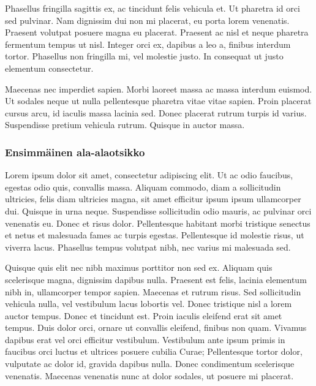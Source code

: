 \documentclass[12pt,a4paper,titlepage]{article}
\begin{document}
Phasellus fringilla sagittis ex, ac tincidunt felis vehicula et. Ut pharetra id orci sed pulvinar. Nam dignissim dui non mi placerat, eu porta lorem venenatis. Praesent volutpat posuere magna eu placerat. Praesent ac nisl et neque pharetra fermentum tempus ut nisl. Integer orci ex, dapibus a leo a, finibus interdum tortor. Phasellus non fringilla mi, vel molestie justo. In consequat ut justo elementum consectetur.

Maecenas nec imperdiet sapien. Morbi laoreet massa ac massa interdum euismod. Ut sodales neque ut nulla pellentesque pharetra vitae vitae sapien. Proin placerat cursus arcu, id iaculis massa lacinia sed. Donec placerat rutrum turpis id varius. Suspendisse pretium vehicula rutrum. Quisque in auctor massa.

\subsubsection{Ensimmäinen ala-alaotsikko}
Lorem ipsum dolor sit amet, consectetur adipiscing elit. Ut ac odio faucibus, egestas odio quis, convallis massa. Aliquam commodo, diam a sollicitudin ultricies, felis diam ultricies magna, sit amet efficitur ipsum ipsum ullamcorper dui. Quisque in urna neque. Suspendisse sollicitudin odio mauris, ac pulvinar orci venenatis eu. Donec et risus dolor. Pellentesque habitant morbi tristique senectus et netus et malesuada fames ac turpis egestas. Pellentesque id molestie risus, ut viverra lacus. Phasellus tempus volutpat nibh, nec varius mi malesuada sed.

Quisque quis elit nec nibh maximus porttitor non sed ex. Aliquam quis scelerisque magna, dignissim dapibus nulla. Praesent est felis, lacinia elementum nibh in, ullamcorper tempor sapien. Maecenas et rutrum risus. Sed sollicitudin vehicula nulla, vel vestibulum lacus lobortis vel. Donec tristique nisl a lorem auctor tempus. Donec et tincidunt est. Proin iaculis eleifend erat sit amet tempus. Duis dolor orci, ornare ut convallis eleifend, finibus non quam. Vivamus dapibus erat vel orci efficitur vestibulum. Vestibulum ante ipsum primis in faucibus orci luctus et ultrices posuere cubilia Curae; Pellentesque tortor dolor, vulputate ac dolor id, gravida dapibus nulla. Donec condimentum scelerisque venenatis. Maecenas venenatis nunc at dolor sodales, ut posuere mi placerat.
\end{document}
